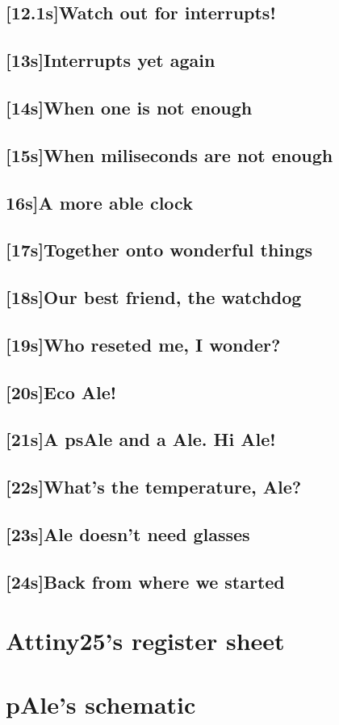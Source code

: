 \documentclass[12pt, a4paper]{book}
\begin{document}
\subsection{[12.1s]Watch out for interrupts!}
\subsection{[13s]Interrupts yet again}
\subsection{[14s]When one is not enough} %
\newenvironment{PseudoCode}{%
\begin{lstlisting}[numbers=left, framexleftmargin=5mm, frame=shadowbox, rulesepcolor=\color{blue}]}{%
\end{lstlisting}}
\subsection{[15s]When miliseconds are not enough}
\subsection{16s]A more able clock}
\subsection{[17s]Together onto wonderful things}
\subsection{[18s]Our best friend, the watchdog}
\subsection{[19s]Who reseted me, I wonder?}
\subsection{[20s]Eco Ale!}
\subsection{[21s]A psAle and a Ale. Hi Ale!}
\subsection{[22s]What's the temperature, Ale?}
\subsection{[23s]Ale doesn't need glasses}
\subsection{[24s]Back from where we started}
\section{Attiny25's register sheet}
\section{pAle's schematic}
\end{document}

